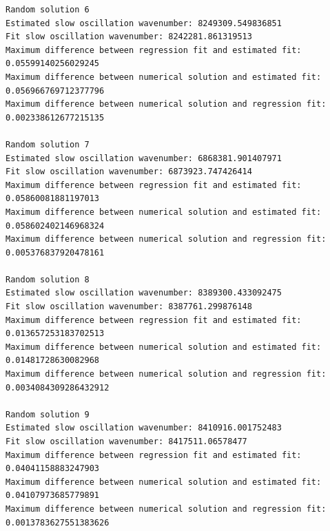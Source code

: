 \documentclass{article}
\begin{document}
\begin{verbatim}
Random solution 6
Estimated slow oscillation wavenumber: 8249309.549836851
Fit slow oscillation wavenumber: 8242281.861319513
Maximum difference between regression fit and estimated fit: 0.05599140256029245
Maximum difference between numerical solution and estimated fit: 0.056966769712377796
Maximum difference between numerical solution and regression fit: 0.002338612677215135

Random solution 7
Estimated slow oscillation wavenumber: 6868381.901407971
Fit slow oscillation wavenumber: 6873923.747426414
Maximum difference between regression fit and estimated fit: 0.05860081881197013
Maximum difference between numerical solution and estimated fit: 0.058602402146968324
Maximum difference between numerical solution and regression fit: 0.005376837920478161

Random solution 8
Estimated slow oscillation wavenumber: 8389300.433092475
Fit slow oscillation wavenumber: 8387761.299876148
Maximum difference between regression fit and estimated fit: 0.013657253183702513
Maximum difference between numerical solution and estimated fit: 0.01481728630082968
Maximum difference between numerical solution and regression fit: 0.0034084309286432912

Random solution 9
Estimated slow oscillation wavenumber: 8410916.001752483
Fit slow oscillation wavenumber: 8417511.06578477
Maximum difference between regression fit and estimated fit: 0.04041158883247903
Maximum difference between numerical solution and estimated fit: 0.04107973685779891
Maximum difference between numerical solution and regression fit: 0.0013783627551383626


\end{verbatim}
\end{document}
